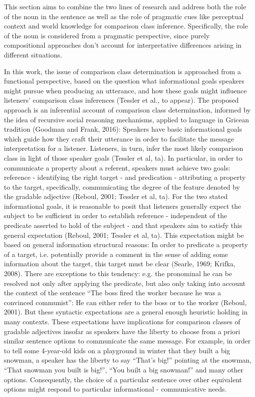 This section aims to combine the two lines of research and address both the role of the noun in the sentence as well as the role of pragmatic cues like perceptual context and world knowledge for comparison class inference. Specifically, the role of the noun is considered from a pragmatic perspective, since purely compositional approaches don’t account for interpretative differences arising in different situations.

In this work, the issue of comparison class determination is approached from a functional perspective, based on the question what informational goals speakers might pursue when producing an utterance, and how these goals might influence listeners’ comparison class inferences (Tessler et al., to appear).
The proposed approach is an inferential account of comparison class determination, informed by the idea of recursive social reasoning mechanisms, applied to language in Gricean tradition (Goodman and Frank, 2016): Speakers have basic informational goals which guide how they craft their utterance in order to facilitate the message interpretation for a listener. Listeners, in turn, infer the most likely comparison class in light of those speaker goals (Tessler et al, ta). In particular, in order to communicate a property about a referent, speakers must achieve two goals: reference - identifying the right target - and predication - attributing a property to the target, specifically, communicating  the degree of the feature denoted by the gradable adjective (Reboul, 2001; Tessler et al, ta).  
For the two stated informational goals, it is reasonable to posit that listeners generally expect the subject to be sufficient in order to establish reference - independent of the predicate asserted to hold of the subject - and that speakers aim to satisfy this general expectation (Reboul, 2001; Tessler et al, ta). This expectation might be based on general information structural reasons: In order to predicate a property of a target, i.e. potentially provide a comment in the sense of adding some information about the target, this target must be clear (Searle, 1969; Krifka, 2008). There are exceptions to this tendency: e.g. the pronominal he can be resolved not only after applying the predicate, but also only taking into account the context of the sentence “The boss fired the worker because he was a convinced communist”: He can either refer to the boss or to the worker (Reboul, 2001). But these syntactic expectations are a general enough heuristic holding in many contexts.
These expectations have implications for comparison classes of gradable adjectives insofar as speakers have the liberty to choose from a priori similar sentence options to communicate the same message. For example, in order to tell some 4-year-old kids on a playground in winter that they built a big snowman, a speaker has the liberty to say “That’s big!” pointing at the snowman, “That snowman you built is big!”, “You built a big snowman!” and many other options. Consequently, the choice of a particular sentence over other equivalent options might respond to particular informational - communicative needs. 

